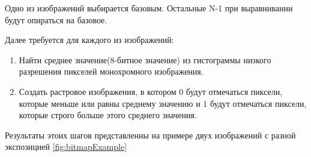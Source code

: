     Одно из изображений выбирается базовым. Остальные N-1 при выравнивании будут опираться на базовое.

    Далее требуется для каждого из изображений:
\begin{enumerate}
    \item Найти среднее значение(8-битное значение) из гистограммы низкого разрешения пикселей монохромного изображения. 
    \item Создать растровое изображения, в котором 0 будут отмечаться пиксели, которые меньше или равны среднему значению и 1 будут отмечаться пиксели, которые строго больше этого среднего значения.
\end{enumerate}

    Результаты этоих шагов представленны на примере двух изображений с разной экспозицией \ref{fig:bitmapExample}

\begin{figure}[ht!]
\end{figure}

